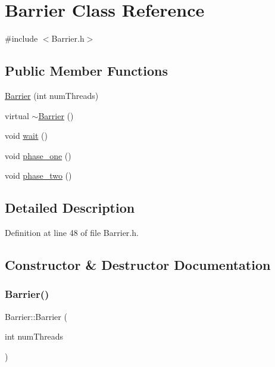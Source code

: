 \hypertarget{class_barrier}{}\section{Barrier Class Reference}
\label{class_barrier}


{\ttfamily \#include $<$Barrier.\+h$>$}

\subsection*{Public Member Functions}
\begin{DoxyCompactItemize}
\item 
\hyperlink{class_barrier_a7290fb8952d0f7779b8d6a7a34bbd407}{Barrier} (int num\+Threads)
\item 
virtual \hyperlink{class_barrier_a401f40e73302009b305904ffc7825304}{$\sim$\+Barrier} ()
\item 
void \hyperlink{class_barrier_a83a9d2e85e98b3d2081538bf0da29b60}{wait} ()
\item 
void \hyperlink{class_barrier_a5be6d04f7ecfad8c43f741ce5294ebc4}{phase\+\_\+one} ()
\item 
void \hyperlink{class_barrier_a4bc5b771e10a8cf2cd136900f36f7055}{phase\+\_\+two} ()
\end{DoxyCompactItemize}


\subsection{Detailed Description}


Definition at line 48 of file Barrier.\+h.



\subsection{Constructor \& Destructor Documentation}
\mbox{\label{class_barrier_a7290fb8952d0f7779b8d6a7a34bbd407}} 
\subsubsection{\texorpdfstring{Barrier()}{Barrier()}}
{\footnotesize\ttfamily Barrier\+::\+Barrier (\begin{DoxyParamCaption}\item[{int}]{num\+Threads }\end{DoxyParamCaption})}




